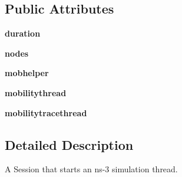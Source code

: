 \subsection*{Public Attributes}
\begin{DoxyCompactItemize}
\item 
\hypertarget{classcorens3_1_1obj_1_1_ns3_session_aef01de458ab2b7cf793d21e4783174a1}{{\bfseries duration}}\label{classcorens3_1_1obj_1_1_ns3_session_aef01de458ab2b7cf793d21e4783174a1}

\item 
\hypertarget{classcorens3_1_1obj_1_1_ns3_session_ab1443296504501a3b35cc2563ecf48ce}{{\bfseries nodes}}\label{classcorens3_1_1obj_1_1_ns3_session_ab1443296504501a3b35cc2563ecf48ce}

\item 
\hypertarget{classcorens3_1_1obj_1_1_ns3_session_a72a94828d5bee4fcacab7f272d895abe}{{\bfseries mobhelper}}\label{classcorens3_1_1obj_1_1_ns3_session_a72a94828d5bee4fcacab7f272d895abe}

\item 
\hypertarget{classcorens3_1_1obj_1_1_ns3_session_ad250951ccbff4fb6aa2f12e5a7d4996b}{{\bfseries mobilitythread}}\label{classcorens3_1_1obj_1_1_ns3_session_ad250951ccbff4fb6aa2f12e5a7d4996b}

\item 
\hypertarget{classcorens3_1_1obj_1_1_ns3_session_ae6209e9cb368bde5b773e03b409221ce}{{\bfseries mobilitytracethread}}\label{classcorens3_1_1obj_1_1_ns3_session_ae6209e9cb368bde5b773e03b409221ce}

\end{DoxyCompactItemize}


\subsection{Detailed Description}
\begin{DoxyVerb}A Session that starts an ns-3 simulation thread.
\end{DoxyVerb}
 

